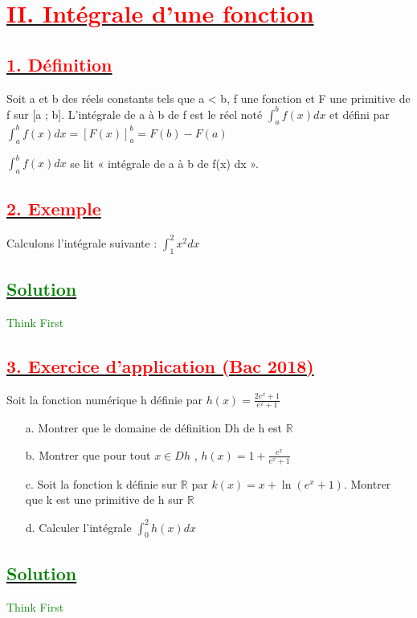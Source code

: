 \documentclass[12pt]{article}
\begin{document}
\section*{\underline{\textbf{\textcolor{red}{II. Intégrale d’une fonction}}}}
\subsection*{\underline{\textbf{\textcolor{red}{1. Définition}}}}
Soit a et b des réels constants tels que a < b, f une fonction et F une primitive de f sur [a ; b]. L’intégrale
de a à b de f est le réel noté $\int_{a}^{b}f(x)dx$ et défini par $\int_{a}^{b}f(x)dx=[F(x)]_{a}^{b}=F(b)-F(a)$

$\int_{a}^{b}f(x)dx$ se lit « intégrale de a à b de f(x) dx ».
\subsection*{\underline{\textbf{\textcolor{red}{2. Exemple}}}}
Calculons l’intégrale suivante : $\int_{1}^{2}x^{2}dx$

\subsection*{\underline{\textbf{\textcolor{green}{Solution}}}}
\textcolor{green}{Think First}
\subsection*{\underline{\textbf{\textcolor{red}{3. Exercice d’application (Bac 2018)}}}}
Soit la fonction numérique h définie par $h(x)=\frac{2e^{x}+1}{e^{x}+1}$
\begin{itemize}
\item[a.] Montrer que le domaine de définition Dh de h est $\mathbb{R}$
\item[b.] Montrer que pour tout $x \in Dh$ , $h(x) =1+\frac{e^{x}}{e^{x}+1} $
\item[c.] Soit la fonction k définie sur $\mathbb{R}$ par $k(x) = x + \ln(e^{x} + 1)$. Montrer que k est une
primitive de h sur $\mathbb{R}$
\item[d.] Calculer l’intégrale $\int_{0}^{2}h(x)dx$
\end{itemize}
\subsection*{\underline{\textbf{\textcolor{green}{Solution}}}}
\textcolor{green}{Think First}
\end{document}
